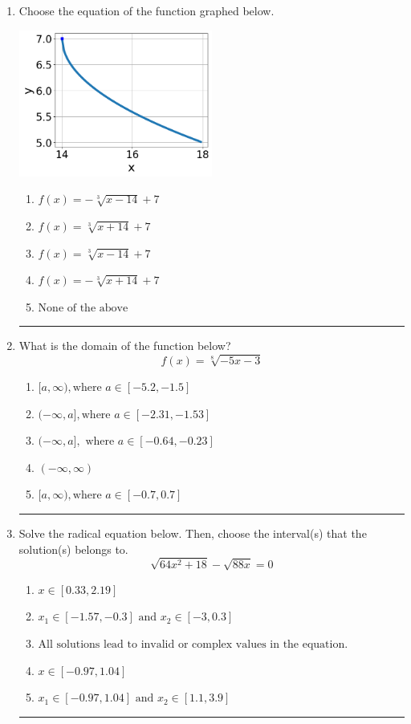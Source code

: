 \documentclass[14pt]{extbook}
\newcommand{\litem}[1]{\item#1\hspace*{-1cm}\rule{\textwidth}{0.4pt}}
\begin{document}
\begin{enumerate}
{\begin{enumerate}[label=\Alph*.]
\end{enumerate} }
\litem{
Choose the equation of the function graphed below.
\begin{center}
    \includegraphics[width=0.5\textwidth]{../Figures/radicalGraphToEquationCopyC.png}
\end{center}
\begin{enumerate}[label=\Alph*.]
\item \( f(x) = - \sqrt[3]{x - 14} + 7 \)
\item \( f(x) = \sqrt[3]{x + 14} + 7 \)
\item \( f(x) = \sqrt[3]{x - 14} + 7 \)
\item \( f(x) = - \sqrt[3]{x + 14} + 7 \)
\item \( \text{None of the above} \)

\end{enumerate} }
\litem{
What is the domain of the function below?\[ f(x) = \sqrt[8]{-5 x - 3} \]\begin{enumerate}[label=\Alph*.]
\item \( [a, \infty), \text{where } a \in [-5.2, -1.5] \)
\item \( (-\infty, a], \text{where } a \in [-2.31, -1.53] \)
\item \( (-\infty, a], \text{ where } a \in [-0.64, -0.23] \)
\item \( (-\infty, \infty) \)
\item \( [a, \infty), \text{where } a \in [-0.7, 0.7] \)

\end{enumerate} }
\litem{
Solve the radical equation below. Then, choose the interval(s) that the solution(s) belongs to.\[ \sqrt{64 x^2 + 18} - \sqrt{88 x} = 0 \]\begin{enumerate}[label=\Alph*.]
\item \( x \in [0.33,2.19] \)
\item \( x_1 \in [-1.57, -0.3] \text{ and } x_2 \in [-3,0.3] \)
\item \( \text{All solutions lead to invalid or complex values in the equation.} \)
\item \( x \in [-0.97,1.04] \)
\item \( x_1 \in [-0.97, 1.04] \text{ and } x_2 \in [1.1,3.9] \)


\end{enumerate}}
\end{enumerate}
\end{document}
